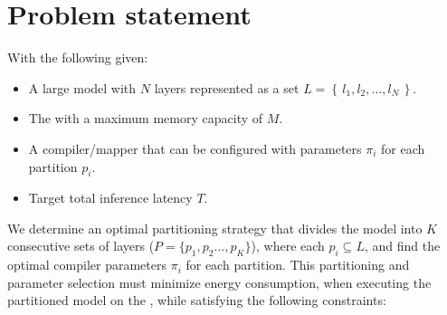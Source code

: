 \section{Problem statement}
\label{section:ch8/problem_statement}

With the following given:
\begin{itemize}
    \item A large model with $N$ layers represented as a set $L = \left\{ \, l_1, l_2, \ldots, l_N \, \right\}$.
    \item The \graicore{} with a maximum memory capacity of $M$.
    \item A compiler/mapper that can be configured with parameters $\pi_i$ for each partition $p_i$.
    \item Target total inference latency $T$.
\end{itemize}
We determine an optimal partitioning strategy that divides the model into $K$ consecutive sets of layers ($P = \{p_1, p_2 \ldots, p_K\}$), where each $p_i \subseteq L$, and find the optimal compiler parameters $\pi_i$ for each partition.
This partitioning and parameter selection must minimize energy consumption, when executing the partitioned model on the \graicore{}, while satisfying the following constraints:

